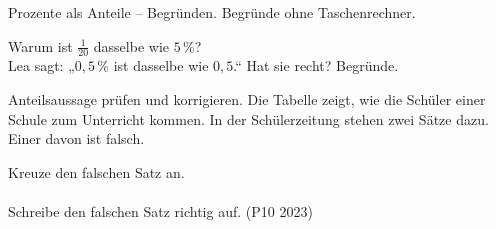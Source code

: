 \begin{aufgabe}{Prozente als Anteile – Begründen. Begründe ohne Taschenrechner.}
\begin{teile}
\teil Warum ist $\frac{1}{20}$ dasselbe wie $5\,\%$? \\ \dsleer\dsleer\dsleer\dsleer
\teil Lea sagt: „$0{,}5\,\%$ ist dasselbe wie $0{,}5$.“ Hat sie recht? Begründe. \\ \dsleer\dsleer\dsleer\dsleer
\end{teile}
\end{aufgabe}

\begin{aufgabe}{Anteilsaussage prüfen und korrigieren. Die Tabelle zeigt, wie die Schüler einer Schule zum Unterricht kommen.}
In der Schülerzeitung stehen zwei Sätze dazu. Einer davon ist falsch.
\begin{teile}
\teil Kreuze den falschen Satz an. \\
\\
\teil Schreibe den falschen Satz richtig auf. \hfill (P10 2023) \\ \dsleer\dsleer\dsleer\dsleer\dsleer
\end{teile}
\end{aufgabe}
